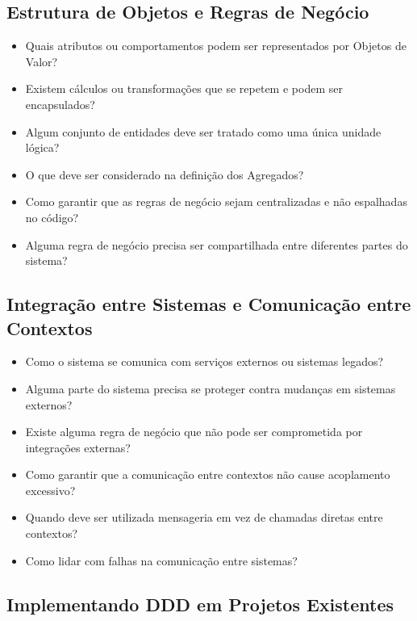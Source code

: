 \subsection{Estrutura de Objetos e Regras de Negócio}

\begin{itemize}
    \item Quais atributos ou comportamentos podem ser representados por Objetos de Valor?
    \item Existem cálculos ou transformações que se repetem e podem ser encapsulados?
    \item Algum conjunto de entidades deve ser tratado como uma única unidade lógica?
    \item O que deve ser considerado na definição dos Agregados?
    \item Como garantir que as regras de negócio sejam centralizadas e não espalhadas no código?
    \item Alguma regra de negócio precisa ser compartilhada entre diferentes partes do sistema?
\end{itemize}

\subsection{Integração entre Sistemas e Comunicação entre Contextos}

\begin{itemize}
    \item Como o sistema se comunica com serviços externos ou sistemas legados?
    \item Alguma parte do sistema precisa se proteger contra mudanças em sistemas externos?
    \item Existe alguma regra de negócio que não pode ser comprometida por integrações externas?
    \item Como garantir que a comunicação entre contextos não cause acoplamento excessivo?
    \item Quando deve ser utilizada mensageria em vez de chamadas diretas entre contextos?
    \item Como lidar com falhas na comunicação entre sistemas?
\end{itemize}

\subsection{Implementando DDD em Projetos Existentes}

